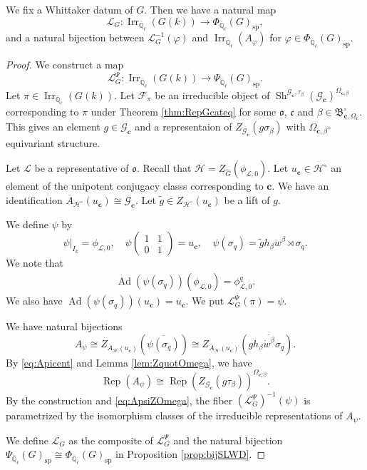 \documentclass[10pt,a4paper]{amsart}
\DeclareMathOperator{\Ad}{Ad}
\DeclareMathOperator{\Irr}{Irr}
\DeclareMathOperator{\Rep}{Rep}
\DeclareMathOperator{\Sh}{Sh}
\newcommand{\mbf}{\mathbf}
\newcommand{\mb}{\mathbb}
\newcommand{\mc}{\mathcal}
\newcommand{\mf}{\mathfrak}
\newcommand{\mr}{\mathrm}
\newcommand{\ol}{\overline}
\newcommand{\wh}{\widehat}
\newcommand{\wt}{\widetilde}
\begin{document}
\begin{thm}\label{thm:LCfin}
We fix a Whittaker datum of $G$. 
Then we have a natural map 
	\[
	\mc{L}_G \colon \Irr_{\ol{\mb{Q}}_{\ell}}(G(k)) \to 
	\Phi_{\ol{\mb{Q}}_{\ell}}(G)_{\mr{sp}},  
	\]
and a natural bijection between $\mc{L}_G^{-1}(\varphi)$ and 
$\Irr_{\ol{\mb{Q}}_{\ell}}(A_{\varphi})$ for $\varphi \in \Phi_{\ol{\mb{Q}}_{\ell}}(G)_{\mr{sp}}$. 
\end{thm}

\begin{proof}
We construct a map 
	\begin{equation}
	\mc{L}_G^{\Psi} \colon \Irr_{\ol{\mb{Q}}_{\ell}}(G(k))  \to 
		\Psi_{\ol{\mb{Q}}_{\ell}}(G)_{\mr{sp}}. 
	\end{equation}
Let $\pi \in \Irr_{\ol{\mb{Q}}_{\ell}}(G(k))$. 
Let $\mc{F}_{\pi}$ be an irreducible object of 
$\Sh^{\mc{G}_{\mbf{c}},\tau_{\beta}}(\mc{G}_{\mbf{c}})^{\Omega_{\mbf{c},\beta}}$ corresponding to $\pi$ under 
Theorem \ref{thm:RepGcateq} 
for some $\mf{o}$, $\mf{c}$ and 
$\beta \in \mf{B}_{\mbf{c},\Omega_{\mbf{c}}}^{\circ}$. 
This gives an element $g \in \mc{G}_{\mbf{c}}$ and a representaion of $Z_{\mc{G}_{\mbf{c}}}(g\sigma_{\beta})$ with $\Omega_{\mbf{c},\beta}$-equivariant structure. 

Let $\mc{L}$ be a representative of $\mf{o}$. 
Recall that $\mc{H}=Z_{\wh{G}}(\phi_{\mc{L},0})$. 
Let $u_{\mbf{c}} \in \mc{H}^{\circ}$ an element of the unipotent conjugacy classs corresponding to $\mbf{c}$. 
We have an identification 
$\ol{A}_{\mc{H}^{\circ}}(u_{\mbf{c}}) \cong \mc{G}_{\mbf{c}}$. 
Let $\wt{g} \in Z_{\mc{H}^{\circ}}(u_{\mbf{c}})$ be a lift of $g$. 

We define $\psi$ by 
\[	 
 \psi|_{I_k}=\phi_{\mc{L},0}, \quad 
\psi \begin{pmatrix}
	1 & 1 \\ 0 & 1 
\end{pmatrix}=u_{\mbf{c}}, \quad  
\psi (\sigma_q) = \wt{g} h_{\beta} \dot{w}^{\beta} \rtimes \sigma_q. 
\]
	We note that 
\begin{align*}
	\Ad(\psi (\sigma_q))(\phi_{\mc{L},0})=\phi_{\mc{L},0}^q. 
\end{align*}
We also have 
$\Ad (\psi (\sigma_q))(u_{\mbf{c}})=u_{\mbf{c}}$. 
We put $\mc{L}_G^{\Psi} (\pi)=\psi$. 

We have natural bijections 
\begin{equation}\label{eq:Apicent}
	A_{\psi}\cong Z_{\ol{A}_{\mc{H}}(u_{\mbf{c}})}(\ol{\psi(\sigma_q)}) \cong Z_{\ol{A}_{\mc{H}}(u_{\mbf{c}})}(g \ol{h_{\beta} \dot{w}^{\beta} \sigma_q}).
\end{equation}
By \eqref{eq:Apicent} and Lemma \ref{lem:ZquotOmega}, 
we have 
\begin{equation}\label{eq:ApsiZOmega}
\Rep (A_{\psi}) \cong \Rep (Z_{\mc{G}_{\mbf{c}}}(g \tau_{\beta}))^{\Omega_{\mbf{c},\beta}} . 
\end{equation}
By the construction and \eqref{eq:ApsiZOmega}, the fiber $(\mc{L}_G^{\Psi})^{-1}(\psi)$ 
is parametrized by 
the isomorphism classes of the irreducible representations of $A_{\psi}$. 

We define $\mc{L}_G$ 
as the composite of $\mc{L}_G^{\Psi}$ 
and 
the natural bijection 
$\Psi_{\ol{\mb{Q}}_{\ell}}(G)_{\mr{sp}} \cong 
\Phi_{\ol{\mb{Q}}_{\ell}}(G)_{\mr{sp}}$ in Proposition \ref{prop:bijSLWD}. 
\end{proof}
\end{document}
